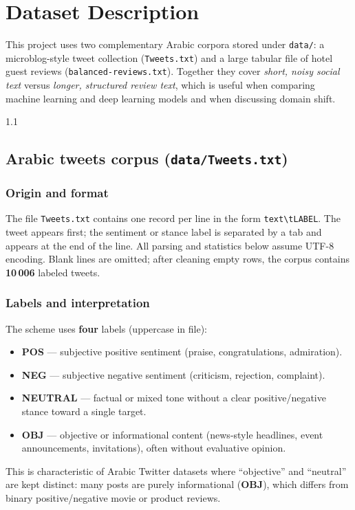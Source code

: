 \documentclass[11pt,a4paper]{report}
\begin{document}
\chapter{Dataset Description}

This project uses two complementary Arabic corpora stored under \texttt{data/}: a microblog-style tweet collection (\texttt{Tweets.txt}) and a large tabular file of hotel guest reviews (\texttt{balanced-reviews.txt}). Together they cover \emph{short, noisy social text} versus \emph{longer, structured review text}, which is useful when comparing machine learning and deep learning models and when discussing domain shift.

\begin{spacing}{1.1}

\section{Arabic tweets corpus (\texttt{data/Tweets.txt})}

\subsection{Origin and format}
The file \texttt{Tweets.txt} contains one record per line in the form \texttt{text\textbackslash tLABEL}. The tweet appears first; the sentiment or stance label is separated by a tab and appears at the end of the line. All parsing and statistics below assume UTF-8 encoding. Blank lines are omitted; after cleaning empty rows, the corpus contains \textbf{10\,006} labeled tweets.

\subsection{Labels and interpretation}
The scheme uses \textbf{four} labels (uppercase in file):
\begin{itemize}[noitemsep]
    \item \textbf{POS} --- subjective positive sentiment (praise, congratulations, admiration).
    \item \textbf{NEG} --- subjective negative sentiment (criticism, rejection, complaint).
    \item \textbf{NEUTRAL} --- factual or mixed tone without a clear positive/negative stance toward a single target.
    \item \textbf{OBJ} --- objective or informational content (news-style headlines, event announcements, invitations), often without evaluative opinion.
\end{itemize}
This is characteristic of Arabic Twitter datasets where ``objective'' and ``neutral'' are kept distinct: many posts are purely informational (\textbf{OBJ}), which differs from binary positive/negative movie or product reviews.


\end{spacing}
\end{document}
